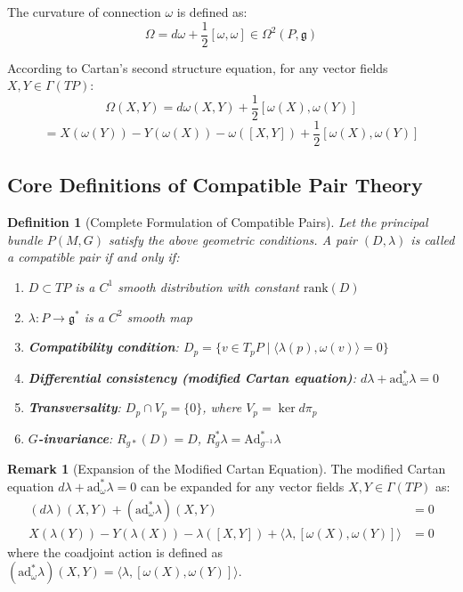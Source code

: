 \documentclass[a4paper,12pt]{extarticle}
\newtheorem{definition}{Definition}
\theoremstyle{definition}
\newtheorem{remark}{Remark}
\begin{document}
The curvature of connection $\omega$ is defined as:
$$\Omega = d\omega + \frac{1}{2}[\omega, \omega] \in \Omega^2(P, \mathfrak{g})$$

According to Cartan's second structure equation, for any vector fields $X, Y \in \Gamma(TP)$:
$$\Omega(X, Y) = d\omega(X, Y) + \frac{1}{2}[\omega(X), \omega(Y)]$$
$$= X(\omega(Y)) - Y(\omega(X)) - \omega([X, Y]) + \frac{1}{2}[\omega(X), \omega(Y)]$$

\subsection{Core Definitions of Compatible Pair Theory}

\begin{definition}[Complete Formulation of Compatible Pairs]
Let the principal bundle $P(M, G)$ satisfy the above geometric conditions. A pair $(D, \lambda)$ is called a compatible pair if and only if:
\begin{enumerate}
\item $D \subset TP$ is a $C^1$ smooth distribution with constant $\text{rank}(D)$
\item $\lambda: P \to \mathfrak{g}^*$ is a $C^2$ smooth map
\item \textbf{Compatibility condition}: $D_p = \{v \in T_pP \mid \langle\lambda(p), \omega(v)\rangle = 0\}$
\item \textbf{Differential consistency (modified Cartan equation)}: $d\lambda + \text{ad}_\omega^* \lambda = 0$
\item \textbf{Transversality}: $D_p \cap V_p = \{0\}$, where $V_p = \ker d\pi_p$
\item \textbf{$G$-invariance}: $R_{g*}(D) = D$, $R_g^* \lambda = \text{Ad}_{g^{-1}}^* \lambda$
\end{enumerate}
\end{definition}

\begin{remark}[Expansion of the Modified Cartan Equation]
The modified Cartan equation $d\lambda + \text{ad}_\omega^* \lambda = 0$ can be expanded for any vector fields $X, Y \in \Gamma(TP)$ as:
\begin{align}
(d\lambda)(X, Y) + (\text{ad}_\omega^* \lambda)(X, Y) &= 0\\
X(\lambda(Y)) - Y(\lambda(X)) - \lambda([X, Y]) + \langle\lambda, [\omega(X), \omega(Y)]\rangle &= 0
\end{align}
where the coadjoint action is defined as $(\text{ad}_\omega^* \lambda)(X, Y) = \langle\lambda, [\omega(X), \omega(Y)]\rangle$.
\end{remark}
\end{document}
